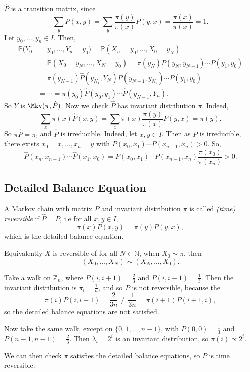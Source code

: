 \documentclass[12pt]{article}
\begin{document}
\begin{proofbox}
	$\hat P$ is a transition matrix, since
	\[
		\sum_{y} \hat P(x, y) = \sum_{y} \frac{\pi(y)}{\pi(x)} P(y, x) = \frac{\pi(x)}{\pi(x)} = 1.
	\]
	Let $y_0, \ldots, y_n \in I$. Then,
	\begin{align*}
		\mathbb{P}(Y_0 &= y_0, \ldots, Y_n = y_0) = \mathbb{P}(X_n = y_0, \ldots, X_0 = y_N) \\
			       &= \mathbb{P}(X_0 = y_N, \ldots, X_N = y_0) = \pi(y_N)P(y_N, y_{N-1})\cdots P(y_1, y_0) \\
			       &= \pi(y_{N-1})\hat P(y_{N_1}, Y_N) P(y_{N-1}, y_{N_2}) \cdots P(y_1, y_0) \\
			       &= \cdots = \pi(y_0) \hat P(y_0, y_1) \cdots \hat P(y_{N-1}, Y_n).
	\end{align*}
	So $Y$ is $\Mkv(\pi, \hat P)$. Now we check $\hat P$ has invariant distribution $\pi$. Indeed,
	\[
		\sum_{x} \pi(x) \hat P(x, y) = \sum_{x} \pi(x) \frac{\pi(y)}{\pi(x)}P(y, x) = \pi(y)
	.\]
	So $\pi \hat P = \pi$, and $\hat P$ is irreducible. Indeed, let $x, y\in I$. Then as $P$ is irreducible, there exists $x_0 = x, \ldots, x_n = y$ with $P(x_0, x_1) \cdots P(x_{n-1}, x_n) > 0$. So,
	\[
		\hat P(x_n, x_{n-1}) \cdots \hat P(x_1, x_0) = P(x_0, x_1) \cdots P(x_{n-1}, x_n) \frac{\pi(x_0)}{\pi(x_n)} > 0
	.\]
\end{proofbox}

\subsection{Detailed Balance Equation}%
\label{sub:detailed_balance_equation}

\begin{definition}
	A Markov chain with matrix $P$ and invariant distribution $\pi$ is called \textit{(time) reversible} if $\hat P = P$, i.e for all $x, y \in I$,
	\[
		\pi(x) P(x, y) = \pi(y) P(y, x)
	,\]
	which is the detailed balance equation.

	Equivalently $X$ is reversible of for all $N \in \mathbb{N}$, when $X_0 \sim \pi$, then
	\[
		(X_0, \ldots, X_N) \sim (X_N, \ldots, X_0)
	.\]
\end{definition}

\begin{exbox}
	Take a walk on $\mathbb{Z}_n$, where $P(i, i+1) = \frac{2}{3}$ and $P(i, i-1) = \frac{1}{3}$. Then the invariant distribution is $\pi_i = \frac{1}{n}$, and so $P$ is not reversible, because the
	\[
		\pi(i) P(i, i+1) = \frac{2}{3n} \neq \frac{1}{3n} = \pi(i+1) P(i+1, i)
	,\]
	so the detailed balance equations are not satisfied.

	Now take the same walk, except on $\{0, 1, \ldots, n-1\}$, with $P(0,0) = \frac{1}{3}$ and $P(n-1,n-1) = \frac{2}{3}$. Then $\lambda_i = 2^{i}$ is an invariant distribution, so $\pi(i) \propto 2^{i}$.

	We can then check $\pi$ satisfies the detailed balance equations, so $P$ is time reversible.
\end{exbox}
\end{document}
